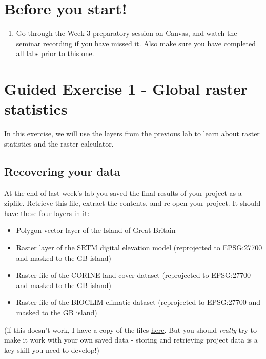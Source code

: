 \documentclass[
  letterpaper,
  DIV=11,
  numbers=noendperiod]{scrreprt}
\providecommand{\tightlist}{%
  \setlength{\itemsep}{0pt}\setlength{\parskip}{0pt}}\usepackage{longtable,booktabs,array}
\begin{document}
\section{Before you start!}\label{before-you-start-4}

\begin{enumerate}
\def\labelenumi{\arabic{enumi}.}
\tightlist
\item
  Go through the Week 3 preparatory session on Canvas, and watch the
  seminar recording if you have missed it. Also make sure you have
  completed all labs prior to this one.
\end{enumerate}

\section{Guided Exercise 1 - Global raster
statistics}\label{guided-exercise-1---global-raster-statistics}

In this exercise, we will use the layers from the previous lab to learn
about raster statistics and the raster calculator.

\subsection{Recovering your data}\label{recovering-your-data}

At the end of last week's lab you saved the final results of your
project as a zipfile. Retrieve this file, extract the contents, and
re-open your project. It should have these four layers in it:

\begin{itemize}
\tightlist
\item
  Polygon vector layer of the Island of Great Britain
\item
  Raster layer of the SRTM digital elevation model (reprojected to
  EPSG:27700 and masked to the GB island)
\item
  Raster file of the CORINE land cover dataset (reprojected to
  EPSG:27700 and masked to the GB island)
\item
  Raster file of the BIOCLIM climatic dataset (reprojected to EPSG:27700
  and masked to the GB island)
\end{itemize}

(if this doesn't work, I have a copy of the files
\href{https://stir-my.sharepoint.com/:u:/g/personal/ala2_stir_ac_uk/Eb28YoDGBM9MlraOgrbiehcBv9Q8BulLcloDNVypXmCUBw?e=DZfrqZ}{here}.
But you should \emph{really} try to make it work with your own saved
data - storing and retrieving project data is a key skill you need to
develop!)
\end{document}
